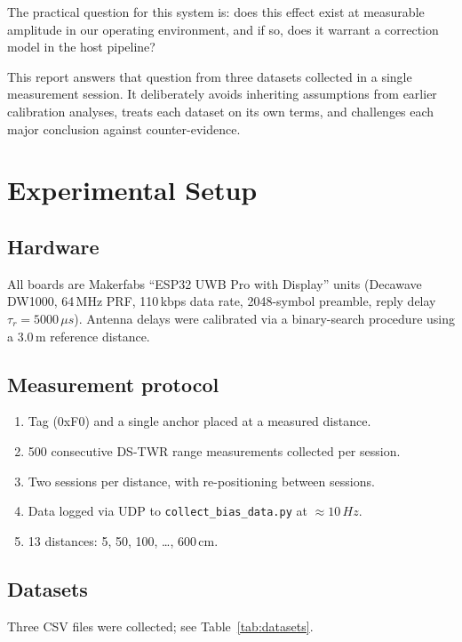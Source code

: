 \documentclass[10pt,a4paper,twocolumn]{article}
\begin{document}
The practical question for this system is: does this effect exist at measurable
amplitude in our operating environment, and if so, does it warrant a
correction model in the host pipeline?

This report answers that question from three datasets collected in a single
measurement session.  It deliberately avoids inheriting assumptions from earlier
calibration analyses, treats each dataset on its own terms, and challenges each
major conclusion against counter-evidence.

\section{Experimental Setup}

\subsection{Hardware}

All boards are Makerfabs ``ESP32 UWB Pro with Display'' units (Decawave DW1000,
64\,MHz PRF, 110\,kbps data rate, 2048-symbol preamble, reply delay
$\tau_r = 5000\,\ensuremath{\mu}s$).  Antenna delays were calibrated via a
binary-search procedure using a 3.0\,m reference distance.

\subsection{Measurement protocol}

\begin{enumerate}[noitemsep]
\item Tag (0xF0) and a single anchor placed at a measured distance.
\item 500 consecutive DS-TWR range measurements collected per session.
\item Two sessions per distance, with re-positioning between sessions.
\item Data logged via UDP to \texttt{collect\_bias\_data.py} at $\approx10\,Hz$.
\item 13 distances: 5, 50, 100, \ldots, 600\,cm.
\end{enumerate}

\subsection{Datasets}

Three CSV files were collected; see Table~\ref{tab:datasets}.
\end{document}
